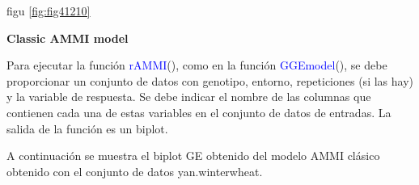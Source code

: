 \begin{itemize}[wide, nosep, labelindent = 0pt, topsep = 1ex, noitemsep,topsep=0pt]
figu \ref{fig:fig41210}


\end{itemize}


\textbf{Classic AMMI model}

Para ejecutar la función \textcolor{blue}{rAMMI}(), como en la función \textcolor{blue}{GGEmodel}(), se debe proporcionar un conjunto de datos con genotipo, entorno, repeticiones (si las hay) y la variable de respuesta. Se debe indicar el nombre de las columnas que contienen cada una de estas variables en el conjunto de datos de entradas. La salida de la función es un biplot.

A continuación se muestra el biplot GE obtenido del modelo AMMI clásico obtenido con el conjunto de datos yan.winterwheat.


